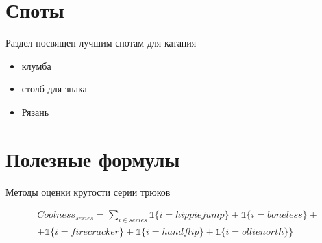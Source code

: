 \documentclass[12pt]{article} %
\begin{document}
\section{Споты}

Раздел посвящен лучшим спотам для катания

\begin{itemize}
\item клумба
\item столб для знака
\item Рязань
\end{itemize}

\section{Полезные формулы}

Методы оценки крутости серии трюков

\begin{equation}
\begin{split} %
Coolness_{series} = \sum\limits_{i\in series} \mathds{1}\{i = hippiejump\} + \mathds{1}\{i = boneless\} + \\
 + \mathds{1}\{i = firecracker\} + \mathds{1}\{i = handflip\} + \mathds{1}\{i = ollienorth\}  \}
\end{split}
\end{equation}
\end{document}
